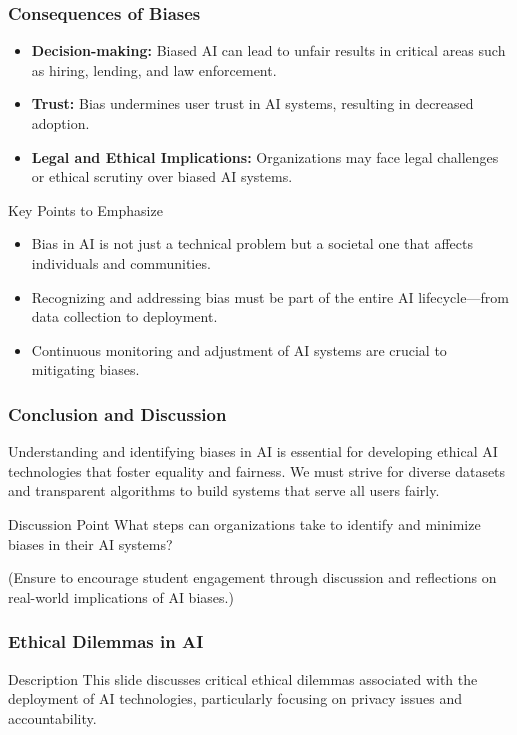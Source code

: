 \documentclass[aspectratio=169]{beamer}
\begin{document}
\begin{frame}[fragile]
  \frametitle{Consequences of Biases}
  \begin{itemize}
    \item \textbf{Decision-making:} Biased AI can lead to unfair results in critical areas such as hiring, lending, and law enforcement.
    \item \textbf{Trust:} Bias undermines user trust in AI systems, resulting in decreased adoption.
    \item \textbf{Legal and Ethical Implications:} Organizations may face legal challenges or ethical scrutiny over biased AI systems.
  \end{itemize}

  \begin{block}{Key Points to Emphasize}
    \begin{itemize}
      \item Bias in AI is not just a technical problem but a societal one that affects individuals and communities.
      \item Recognizing and addressing bias must be part of the entire AI lifecycle—from data collection to deployment.
      \item Continuous monitoring and adjustment of AI systems are crucial to mitigating biases.
    \end{itemize}
  \end{block}
\end{frame}

\begin{frame}[fragile]
  \frametitle{Conclusion and Discussion}
  Understanding and identifying biases in AI is essential for developing ethical AI technologies that foster equality and fairness. We must strive for diverse datasets and transparent algorithms to build systems that serve all users fairly.
  
  \begin{block}{Discussion Point}
    What steps can organizations take to identify and minimize biases in their AI systems?
  \end{block}

  \tiny{(Ensure to encourage student engagement through discussion and reflections on real-world implications of AI biases.)}
\end{frame}

\begin{frame}[fragile]
    \frametitle{Ethical Dilemmas in AI}
    \begin{block}{Description}
        This slide discusses critical ethical dilemmas associated with the deployment of AI technologies, particularly focusing on privacy issues and accountability.
    \end{block}
\end{frame}
\end{document}
